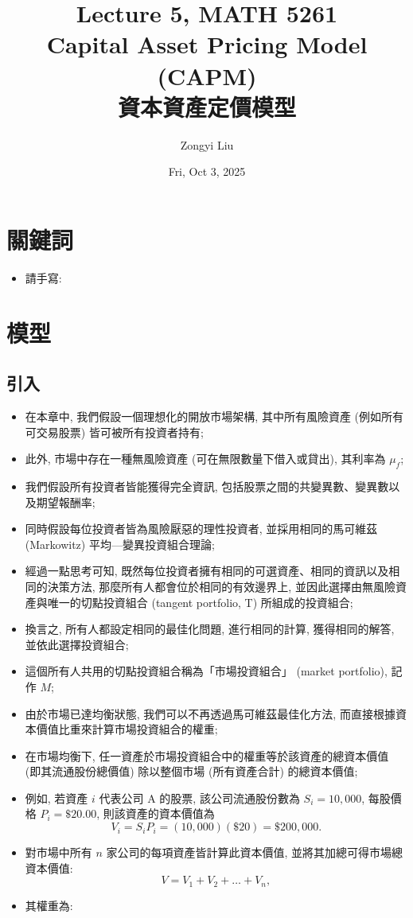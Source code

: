 \documentclass[letterpaper]{article}
\title{Lecture 5, MATH 5261 \\
		\small{Capital Asset Pricing Model  (CAPM) \\
			資本資產定價模型
		}
	}
\author{Zongyi Liu}
\date{Fri, Oct 3, 2025}
\begin{document}
	\maketitle
	
	\tableofcontents
	
	\section{關鍵詞}
	\begin{itemize}
		\item 請手寫: 
	\end{itemize}



\section{模型}
\subsection{引入}
\begin{itemize}
	\item 在本章中, 我們假設一個理想化的開放市場架構, 其中所有風險資產 (例如所有可交易股票) 皆可被所有投資者持有; 
	\item 此外, 市場中存在一種無風險資產 (可在無限數量下借入或貸出), 其利率為 $\mu_{f}$; 
	\item 我們假設所有投資者皆能獲得完全資訊, 包括股票之間的共變異數、變異數以及期望報酬率; 
	\item 同時假設每位投資者皆為風險厭惡的理性投資者, 並採用相同的馬可維茲 (Markowitz) 平均—變異投資組合理論; 
	\item 經過一點思考可知, 既然每位投資者擁有相同的可選資產、相同的資訊以及相同的決策方法, 那麼所有人都會位於相同的有效邊界上, 並因此選擇由無風險資產與唯一的切點投資組合 (tangent portfolio, T) 所組成的投資組合; 
	\item 換言之, 所有人都設定相同的最佳化問題, 進行相同的計算, 獲得相同的解答, 並依此選擇投資組合; 
	\item 這個所有人共用的切點投資組合稱為「市場投資組合」 (market portfolio), 記作 $M$; 
	\item 由於市場已達均衡狀態, 我們可以不再透過馬可維茲最佳化方法, 而直接根據資本價值比重來計算市場投資組合的權重; 
	\item 在市場均衡下, 任一資產於市場投資組合中的權重等於該資產的總資本價值 (即其流通股份總價值) 除以整個市場 (所有資產合計) 的總資本價值; 
	\item 例如, 若資產 $i$ 代表公司 A 的股票, 該公司流通股份數為 $S_{i}=10{, }000$, 每股價格 $P_{i}=\$20.00$, 則該資產的資本價值為
	$$V_{i} = S_{i} P_{i} =  (10{, }000)  (\$20) = \$200{, }000. $$
	\item 對市場中所有 $n$ 家公司的每項資產皆計算此資本價值, 並將其加總可得市場總資本價值: 
	$$V = V_{1} + V_{2} + \ldots + V_{n}, $$
	\item 其權重為: 
\end{itemize}
\end{document}
